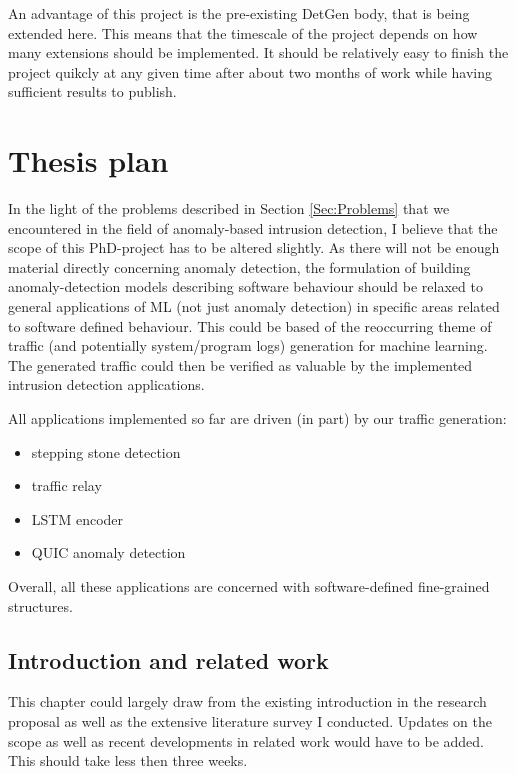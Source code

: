 \documentclass[a4paper,12pt,twoside]{article}
\begin{document}
An advantage of this project is the pre-existing DetGen body, that is being extended here. This means that the timescale of the project depends on how many extensions should be implemented. It should be relatively easy to finish the project quikcly at any given time after about two months of work while having sufficient results to publish. 


\section{Thesis plan}

In the light of the problems described in Section \ref{Sec:Problems} that we encountered in the field of anomaly-based intrusion detection, I believe that the scope of this PhD-project has to be altered slightly. As there will not be enough material directly concerning anomaly detection, the formulation of building anomaly-detection models describing software behaviour should be relaxed to general applications of ML (not just anomaly detection) in specific areas related to software defined behaviour. This could be based of the reoccurring theme of traffic (and potentially system/program logs) generation for machine learning. The generated traffic could then be verified as valuable by the implemented intrusion detection applications.

All applications implemented so far are driven (in part) by our traffic generation:
\begin{itemize}
\item stepping stone detection
\item traffic relay
\item LSTM encoder
\item QUIC anomaly detection
\end{itemize}

Overall, all these applications are concerned with software-defined fine-grained structures.

\subsection{Introduction and related work}

This chapter could largely draw from the existing introduction in the research proposal as well as the extensive literature survey I conducted. Updates on the scope as well as recent developments in related work would have to be added. This should take less then three weeks.
\end{document}
